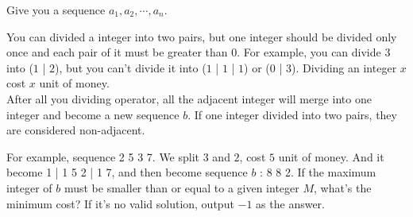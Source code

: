 Give you a sequence $a_{1},a_{2}, \cdots ,a_{n}$.

You can divided a integer into two pairs, but one integer should be divided only once and each pair of it must be greater than $0$. For example, you can divide $3$ into ($1$ | $2$), but you can't divide it into ($1$ | $1$ | $1$) or ($0$ | $3$). Dividing an integer $x$ cost $x$ unit of money.\\
After all you dividing operator, all the adjacent integer will merge into one integer and become a new sequence $b$. If one integer divided into two pairs, they are considered non-adjacent.

For example, sequence 2 5 3 7. We split $3$ and $2$, cost $5$ unit of money.
And it become 1 | 1 5 2 | 1 7, and then become sequence $b$ : 8 8 2.
If the maximum integer of $b$ must be smaller than or equal to a given integer $M$, what's the minimum cost? If it's no valid solution, output $-1$ as the answer. 
